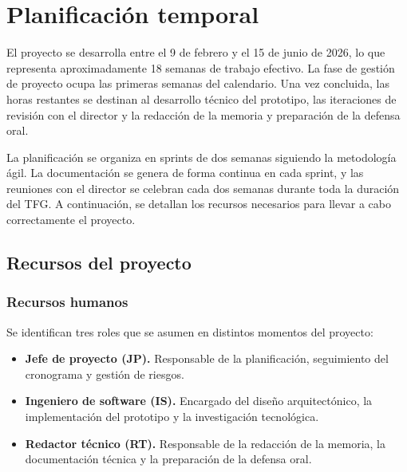 \documentclass{article}
\begin{document}
\section{Planificación temporal}
{                
    \setlength{\parskip}{1em}
    
    \justify
    El proyecto se desarrolla entre el 9 de febrero y el 15 de junio de 2026, lo que
    representa aproximadamente 18 semanas de trabajo efectivo. La fase de gestión de
    proyecto ocupa las primeras semanas del calendario. Una vez concluida, las horas 
    restantes se destinan al desarrollo técnico del prototipo, las iteraciones de 
    revisión con el director y la redacción de la memoria y preparación de la defensa oral.

    \justify
    La planificación se organiza en sprints de dos semanas siguiendo la metodología ágil.
    La documentación se genera de forma continua en cada sprint, y las reuniones con el 
    director se celebran cada dos semanas durante toda la duración del TFG. 
    A continuación, se detallan los recursos necesarios para llevar a cabo correctamente 
    el proyecto.
    \par

    \subsection{Recursos del proyecto}

    \subsubsection{Recursos humanos}
        \justify
        Se identifican tres roles que se asumen en distintos momentos del proyecto:

        \begin{itemize}[leftmargin=*, itemsep=1pt]
        \item \textbf{Jefe de proyecto (JP).} Responsable de la planificación, seguimiento del
            cronograma y gestión de riesgos.
        \item \textbf{Ingeniero de software (IS).} Encargado del diseño arquitectónico, la
            implementación del prototipo y la investigación tecnológica.
        \item \textbf{Redactor técnico (RT).} Responsable de la redacción de la memoria, la
            documentación técnica y la preparación de la defensa oral.
        \end{itemize}

}
\end{document}
